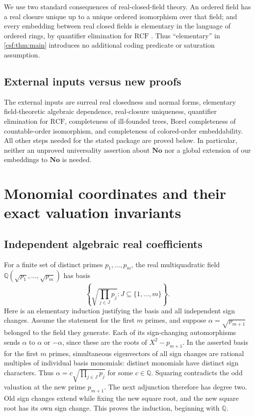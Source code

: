 \documentclass[11pt,a4paper]{article}
\numberwithin{equation}{section}
\theoremstyle{definition}
\theoremstyle{remark}
\newcommand{\Q}{\mathbb Q}
\newcommand{\No}{\mathbf{No}}
\newcommand{\RCF}{\mathrm{RCF}}
\begin{document}
We use two standard consequences of real-closed-field theory. An ordered
field has a real closure unique up to a unique ordered isomorphism over that
field; and every embedding between real closed fields is elementary in the
language of ordered rings, by quantifier elimination for $\RCF$
\cite{marker}. Thus ``elementary'' in \cref{csf:thm:main} introduces no additional
coding predicate or saturation assumption.

\subsection{External inputs versus new proofs}

The external inputs are surreal real closedness and normal forms, elementary
field-theoretic algebraic dependence, real-closure uniqueness, quantifier
elimination for $\RCF$, completeness of ill-founded trees, Borel completeness
of countable-order isomorphism, and completeness of colored-order
embeddability. All other steps needed for the stated package are proved
below. In particular, neither an unproved universality assertion about
$\No$ nor a global extension of our embeddings to $\No$ is needed.

\section{Monomial coordinates and their exact valuation invariants}
\label{csf:sec:coordinates}

\subsection{Independent algebraic real coefficients}

For a finite set of distinct primes $p_1,\ldots,p_m$, the real multiquadratic
field $\Q(\sqrt{p_1},\ldots,\sqrt{p_m})$ has basis
\[
 \left\{\sqrt{\prod_{j\in J}p_j}:J\subseteq\{1,\ldots,m\}\right\}.
\]
Here is an elementary induction justifying the basis and all independent
sign changes. Assume the statement for the first $m$ primes, and suppose
$\alpha=\sqrt{p_{m+1}}$ belonged to the field they generate. Each of its
sign-changing automorphisms sends $\alpha$ to $\alpha$ or $-\alpha$,
since these are the roots of $X^2-p_{m+1}$. In the asserted basis for the
first $m$ primes, simultaneous eigenvectors of all sign changes are
rational multiples of individual basis monomials: distinct monomials have
distinct sign characters. Thus
$\alpha=c\sqrt{\prod_{j\in J}p_j}$ for some $c\in\Q$.
Squaring contradicts the odd valuation at the new prime $p_{m+1}$.
The next adjunction therefore has degree two. Old sign changes extend
while fixing the new square root, and the new square root has its own
sign change. This proves the induction, beginning with $\Q$.
\end{document}
